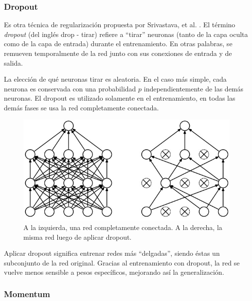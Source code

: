 \documentclass[spanish]{report}
\begin{document}
\subsubsection{Dropout}

Es otra técnica de regularización propuesta por Srivastava, et al. \cite{dropout_paper}. El término \textit{dropout} (del inglés drop - tirar) refiere a ``tirar'' neuronas (tanto de la capa oculta como de la capa de entrada) durante el entrenamiento. En otras palabras, se remueven temporalmente de la red junto con sus conexiones de entrada y de salida.

La elección de qué neuronas tirar es aleatoria. En el caso más simple, cada neurona es conservada con una probabilidad $p$ independientemente de las demás neuronas. El dropout es utilizado solamente en el entrenamiento, en todas las demás fases se usa la red completamente conectada.

\begin{figure}[H]
\centering
 \includegraphics[width=\linewidth]{dropout.jpeg}
  \caption[A la izquierda, una red completamente conectada. A la derecha, la misma red luego de aplicar dropout.]{A la izquierda, una red completamente conectada. A la derecha, la misma red luego de aplicar dropout. \protect\footnotemark}
  \label{fig:dropout}
\end{figure}


Aplicar dropout significa entrenar redes más ``delgadas'', siendo éstas un subconjunto de la red original. Gracias al entrenamiento con dropout, la red se vuelve menos sensible a pesos específicos, mejorando así la generalización.

\subsubsection{Momentum}
\end{document}
